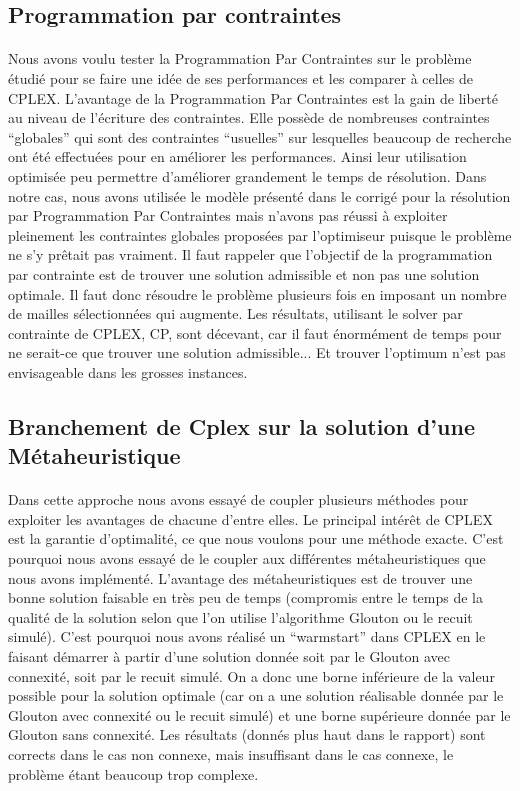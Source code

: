 \documentclass[a4paper, 11pt]{article} %
\begin{document}
\subsection{Programmation par contraintes}

\paragraph*{}
Nous avons voulu tester la Programmation Par Contraintes sur le problème étudié pour se faire une idée de ses performances et les comparer à celles de CPLEX. L'avantage de la Programmation Par Contraintes est la gain de liberté au niveau de l'écriture des contraintes. Elle possède de nombreuses contraintes ``globales'' qui sont des contraintes ``usuelles'' sur lesquelles beaucoup de recherche ont été effectuées pour en améliorer les performances. Ainsi leur utilisation optimisée peu permettre d'améliorer grandement le temps de résolution. Dans notre cas, nous avons utilisée le modèle présenté dans le corrigé pour la résolution par Programmation Par Contraintes mais n'avons pas réussi à exploiter pleinement les contraintes globales proposées par l'optimiseur puisque le problème ne s'y prêtait pas vraiment. Il faut rappeler que l'objectif de la programmation par contrainte est de trouver une solution admissible et non pas une solution optimale. Il faut donc résoudre le problème plusieurs fois en imposant un nombre de mailles sélectionnées qui augmente. Les résultats, utilisant le solver par contrainte de CPLEX, CP, sont décevant, car il faut énormément de temps pour ne serait-ce que trouver une solution admissible... Et trouver l'optimum n'est pas envisageable dans les grosses instances.

\subsection{Branchement de Cplex sur la solution d'une Métaheuristique}

\paragraph*{}
Dans cette approche nous avons essayé de coupler plusieurs méthodes pour exploiter les avantages de chacune d'entre elles. Le principal intérêt de CPLEX est la garantie d'optimalité, ce que nous voulons pour une méthode exacte. C'est pourquoi nous avons essayé de le coupler aux différentes métaheuristiques que nous avons implémenté. L'avantage des métaheuristiques est de trouver une bonne solution faisable en très peu de temps (compromis entre le temps de la qualité de la solution selon que l'on utilise l'algorithme Glouton ou le recuit simulé). C'est pourquoi nous avons réalisé un ``warmstart'' dans CPLEX en le faisant démarrer à partir d'une solution donnée soit par le Glouton avec connexité, soit par le recuit simulé. On a donc une borne inférieure de la valeur possible pour la solution optimale (car on a une solution réalisable donnée par le Glouton avec connexité ou le recuit simulé) et une borne supérieure donnée par le Glouton sans connexité. Les résultats (donnés plus haut dans le rapport) sont corrects dans le cas non connexe, mais insuffisant dans le cas connexe, le problème étant beaucoup trop complexe.
\end{document}
